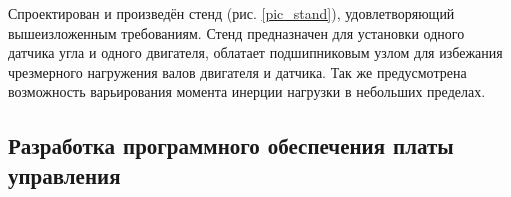 Спроектирован и произведён стенд (рис. \ref{pic_stand}), удовлетворяющий
вышеизложенным требованиям. Стенд предназначен для установки одного датчика угла
и одного двигателя, облатает подшипниковым узлом для избежания чрезмерного
нагружения валов двигателя и датчика. Так же предусмотрена возможность
варьирования момента инерции нагрузки в небольших пределах.

\clearpage
\subsection{Разработка программного обеспечения платы управления}

